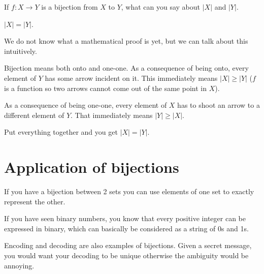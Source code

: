\documentclass[12pt]{article}
\begin{document}
\medskip

If $f: X \rightarrow Y$ is a bijection from $X$ to $Y$, what can you say about $|X|$ and $|Y|$.

$|X| = |Y|$.

We do not know what a mathematical proof is yet, but we can talk about this intuitively.

Bijection means both onto and one-one. As a consequence of being onto, every element of $Y$ has some arrow incident on it. This immediately means $|X| \ge |Y|$ ($f$ is a function so two arrows cannot come out of the same point in $X$).

As a consequence of being one-one, every element of $X$ has to shoot an arrow to a different element of $Y$. That immediately means $|Y| \ge |X|$. 

Put everything together and you get $|X| = |Y|$.

\section*{Application of bijections}

If you have a bijection between 2 sets you can use elements of one set to exactly represent the other.

If you have seen binary numbers, you know that every positive integer can be expressed in binary, which can basically be considered as a string of 0s and 1s. 

Encoding and decoding are also examples of bijections. Given a secret message, you would want your decoding to be unique otherwise the ambiguity would be annoying.
\end{document}
